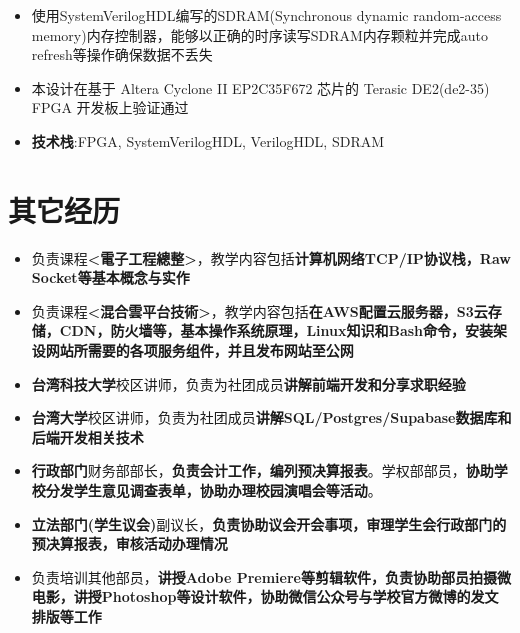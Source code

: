 \documentclass{resume}
\begin{document}
        \begin{itemize}
            \item 使用SystemVerilogHDL编写的SDRAM(Synchronous dynamic random-access memory)内存控制器，能够以正确的时序读写SDRAM内存颗粒并完成auto refresh等操作确保数据不丢失
            \item 本设计在基于 Altera Cyclone II EP2C35F672 芯片的 Terasic DE2(de2-35) FPGA 开发板上验证通过
            \item \textbf{技术栈}:FPGA, SystemVerilogHDL, VerilogHDL, SDRAM
        \end{itemize}

\section{ 其它经历}
        \begin{itemize}
            \item 负责课程\textbf{<電子工程總整>}，教学内容包括\textbf{计算机网络TCP/IP协议栈，Raw Socket等基本概念与实作}
            \item 负责课程\textbf{<混合雲平台技術>}，教学内容包括\textbf{在AWS配置云服务器，S3云存储，CDN，防火墙等，基本操作系统原理，Linux知识和Bash命令，安装架设网站所需要的各项服务组件，并且发布网站至公网}
        \end{itemize}
        \begin{itemize}
            \item \textbf{台湾科技大学}校区讲师，负责为社团成员\textbf{讲解前端开发和分享求职经验}
            \item \textbf{台湾大学}校区讲师，负责为社团成员\textbf{讲解SQL/Postgres/Supabase数据库和后端开发相关技术}
        \end{itemize}
        \begin{itemize}
            \item \textbf{行政部门}财务部部长，\textbf{负责会计工作，编列预决算报表}。学权部部员，\textbf{协助学校分发学生意见调查表单，协助办理校园演唱会等活动}。
            \item \textbf{立法部门(学生议会)}副议长，\textbf{负责协助议会开会事项，审理学生会行政部门的预决算报表，审核活动办理情况}
        \end{itemize}
        \begin{itemize}
            \item 负责培训其他部员，\textbf{讲授Adobe Premiere等剪辑软件，负责协助部员拍摄微电影，讲授Photoshop等设计软件，协助微信公众号与学校官方微博的发文排版等工作}
        \end{itemize}
\end{document}
